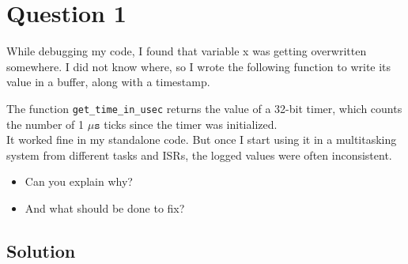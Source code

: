 \section*{Question 1}

While debugging my code, I found that variable x was getting overwritten somewhere.
I did not know where, so I wrote the following function to write its value in a buffer, along with a timestamp.

The function \texttt{get\_time\_in\_usec} returns the value of a 32-bit timer, which counts the number of 1 \( \mu \texttt{s} \) ticks since the timer was initialized. \\
It worked fine in my standalone code.
But once I start using it in a multitasking system from different tasks and ISRs, the logged values were often inconsistent.
\begin{itemize}[noitemsep, topsep=0pt, leftmargin=*]
    \item Can you explain why?
    \item And what should be done to fix?
\end{itemize}

\vspace*{-1em}
\subsection*{Solution}
